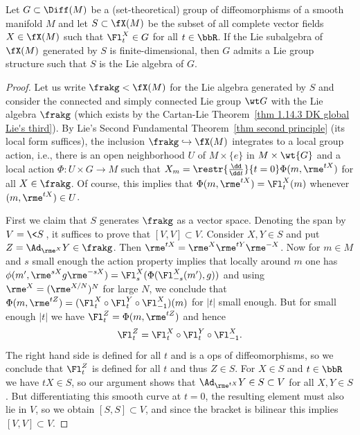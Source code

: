 \begin{cor}\label{prop 1.5.11 Cap}
    Let $G\subset \Diff(M)$ be a (set-theoretical) group of diffeomorphisms of a smooth manifold $M$ and let $S\subset \fX(M)$ be the subset of all complete vector fields $X\in\fX(M)$ such that $\Fl^X_t\in G$ for all $t\in \bbR$. If the Lie subalgebra of $\fX(M)$ generated by $S$ is finite-dimensional, then $G$ admits a Lie group structure such that $S$ is the Lie algebra of $G$.
\end{cor}
\begin{proof}
    Let us write $\frakg<\fX(M)$ for the Lie algebra generated by $S$ and consider the connected and simply connected Lie group $\wt G$ with the Lie algebra $\frakg$ (which exists by the Cartan-Lie Theorem~\ref{thm 1.14.3 DK global Lie's third}). By Lie's Second Fundamental Theorem~\ref{thm second principle} (its local form suffices), the inclusion $\frakg\hookrightarrow\fX(M)$ integrates to a local group action, i.e., there is an open neighborhood $U$ of $M\times\{e\}$ in $M\times\wt{G}$ and a local action $\Phi:U\times G\to M$ such that $X_m=\restr{\frac{\dd}{\dd t}}{t=0}\Phi(m,\rme^{tX})$ for all $X\in\frakg$. Of course, this implies that $\Phi(m,\rme^{tX})=\Fl_t^X(m)$ whenever $(m,\rme^{tX})\in U$.

    First we claim that $S$ generates $\frakg$ as a vector space. Denoting the span by $V=\<S\>$, it suffices to prove that $[V,V]\subset V$. Consider $X,Y\in S$ and put $Z=\Ad_{\rme^{X}}Y\in\frakg$. Then $\rme^{tX}=\rme^X\rme^{tY}\rme^{-X}$. Now for $m\in M$ and $s$ small enough the action property implies that locally around $m$ one has $\phi(m',\rme^{sX}g\rme^{-sX})=\Fl_s^X(\Phi(\Fl_{-s}^X(m'),g))$ and using $\rme^X=(\rme^{X/N})^N$  for large $N$, we conclude that $\Phi(m,\rme^{tZ})=(\Fl_t^X\circ\Fl_t^Y\circ \Fl_{-1}^X)(m)$ for $|t|$ small enough. But for small enough $|t|$ we have $\Fl_t^Z=\Phi(m,\rme^{tZ})$ and hence 
    \[\Fl_t^Z=\Fl_t^X\circ \Fl_t^Y\circ \Fl_{-1}^X.\]
    The right hand side is defined for all $t$ and is a \gls{ops} of diffeomorphisms, so we conclude that $\Fl_t^Z$ is defined for all $t$ and thus $Z\in S$. For $X\in S$ and $t\in\bbR$ we have $tX\in S$, so our argument shows that $\Ad_{\rme^{tX}}Y\in S\subset V$ for all $X,Y\in S$. But differentiating this smooth curve at $t=0$, the resulting element must also lie in $V$, so we obtain $[S,S]\subset V$, and since the bracket is bilinear this implies $[V,V]\subset V$.


\end{proof}
